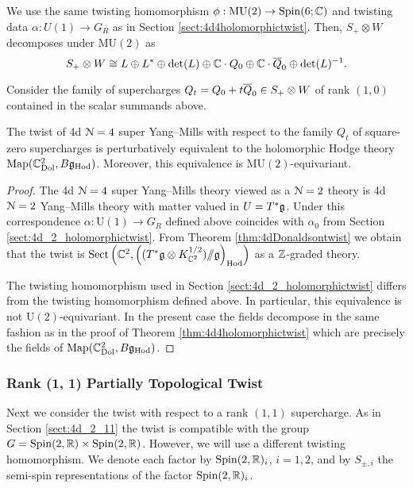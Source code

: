 \documentclass[10pt, oneside]{article}
\newcommand{\Hod}{\mathrm{Hod}}
\newcommand{\MU}{\mathrm{MU}}
\newcommand{\Sect}{\mathrm{Sect}}
\renewcommand{\U}{\mathrm{U}}
\newcommand{\ham}{/\!\!/}
\begin{document}
We use the same twisting homomorphism $\phi : \MU(2) \to \Spin(6;\CC)$ and twisting data $\alpha : U(1) \to G_R$ as in Section \ref{sect:4d4holomorphictwist}.
Then, $S_+ \otimes W$ decomposes under $\MU(2)$ as
\[
S_+\otimes W\cong L\oplus L^*\oplus \det(L)\oplus \CC \cdot Q_0 \oplus \CC \cdot \Bar{Q}_0 \oplus \det(L)^{-1}.
\]

Consider the family of supercharges $Q_t = Q_0 + t \Bar{Q}_0 \in S_+\otimes W$ of rank $(1, 0)$ contained in the scalar summands above.

\begin{theorem}
The twist of 4d $\cN=4$ super Yang--Mills with respect to the family $Q_t$ of square-zero supercharges is perturbatively equivalent to the holomorphic Hodge theory $\map(\CC^2_{\rm Dol}, B \fg_{\rm Hod})$. 
Moreover, this equivalence is $\MU(2)$-equivariant.
\label{thm:4d4Atwist}
\end{theorem}
\begin{proof}
The 4d $\cN=4$ super Yang--Mills theory viewed as a $\cN=2$ theory is 4d $\cN=2$ Yang--Mills theory with matter valued in $U=T^*\fg$. 
Under this correspondence $\alpha\colon \U(1)\rightarrow G_R$ defined above coincides with $\alpha_0$ from Section \ref{sect:4d_2_holomorphictwist}. 
From Theorem \ref{thm:4dDonaldsontwist} we obtain that the twist is $\Sect\left(\CC^2, \left((T^*\fg \otimes K_{\CC^2}^{1/2})\ham \fg\right)_{\Hod}\right)$ as a $\ZZ$-graded theory. 

The twisting homomorphism used in Section \ref{sect:4d_2_holomorphictwist} differs from the twisting homomorphism defined above. 
In particular, this equivalence is not $\U(2)$-equivariant. In the present case the fields decompose in the same fashion as in the proof of Theorem \ref{thm:4d4holomorphictwist} which are precisely the fields of $\map(\CC^2_{\rm Dol}, B \fg_{\rm Hod})$.
\end{proof}

\subsubsection{Rank (1, 1) Partially Topological Twist}
\label{sect:4d4partialtwist}

Next we consider the twist with respect to a rank $(1,1)$ supercharge. As in Section \ref{sect:4d_2_11} the twist is compatible with the group $G = \Spin(2, \RR) \times \Spin(2, \RR)$. However, we will use a different twisting homomorphism. We denote each factor by $\Spin(2, \RR)_i$, $i=1,2$, and by $S_{\pm, i}$ the semi-spin representations of the factor $\Spin(2, \RR)_i$.
\end{document}
